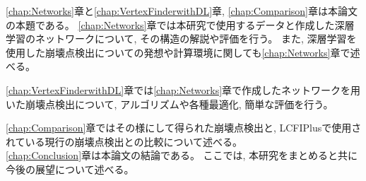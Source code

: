 \ref{chap:Networks}章と\ref{chap:VertexFinderwithDL}章, \ref{chap:Comparison}章は本論文の本題である。
\ref{chap:Networks}章では本研究で使用するデータと作成した深層学習のネットワークについて, その構造の解説や評価を行う。
また, 深層学習を使用した崩壊点検出についての発想や計算環境に関しても\ref{chap:Networks}章で述べる。

\ref{chap:VertexFinderwithDL}章では\ref{chap:Networks}章で作成したネットワークを用いた崩壊点検出について, アルゴリズムや各種最適化, 簡単な評価を行う。

\ref{chap:Comparison}章ではその様にして得られた崩壊点検出と, LCFIPlusで使用されている現行の崩壊点検出との比較について述べる。\\

\ref{chap:Conclusion}章は本論文の結論である。
ここでは, 本研究をまとめると共に今後の展望について述べる。

















